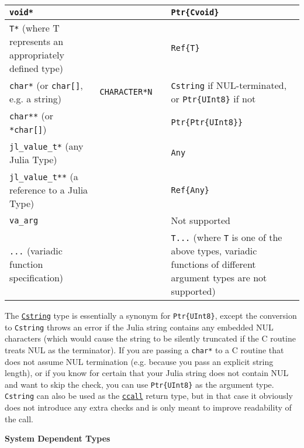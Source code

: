 \begin{table}[h]
\begin{tabulary}{\linewidth}{|L|L|L|L|}
\hline
\texttt{void*} &  &  & \texttt{Ptr\{Cvoid\}} \\
\hline
\texttt{T*} (where T represents an appropriately defined type) &  &  & \texttt{Ref\{T\}} \\
\hline
\texttt{char*} (or \texttt{char[]}, e.g. a string) & \texttt{CHARACTER*N} &  & \texttt{Cstring} if NUL-terminated, or \texttt{Ptr\{UInt8\}} if not \\
\hline
\texttt{char**} (or \texttt{*char[]}) &  &  & \texttt{Ptr\{Ptr\{UInt8\}\}} \\
\hline
\texttt{jl\_value\_t*} (any Julia Type) &  &  & \texttt{Any} \\
\hline
\texttt{jl\_value\_t**} (a reference to a Julia Type) &  &  & \texttt{Ref\{Any\}} \\
\hline
\texttt{va\_arg} &  &  & Not supported \\
\hline
\texttt{...} (variadic function specification) &  &  & \texttt{T...} (where \texttt{T} is one of the above types, variadic functions of different argument types are not supported) \\
\hline
\end{tabulary}

\end{table}



The \hyperlink{8632604011862685836}{\texttt{Cstring}} type is essentially a synonym for \texttt{Ptr\{UInt8\}}, except the conversion to \texttt{Cstring} throws an error if the Julia string contains any embedded NUL characters (which would cause the string to be silently truncated if the C routine treats NUL as the terminator).  If you are passing a \texttt{char*} to a C routine that does not assume NUL termination (e.g. because you pass an explicit string length), or if you know for certain that your Julia string does not contain NUL and want to skip the check, you can use \texttt{Ptr\{UInt8\}} as the argument type. \texttt{Cstring} can also be used as the \hyperlink{14245046751182637566}{\texttt{ccall}} return type, but in that case it obviously does not introduce any extra checks and is only meant to improve readability of the call.



\textbf{System Dependent Types}




